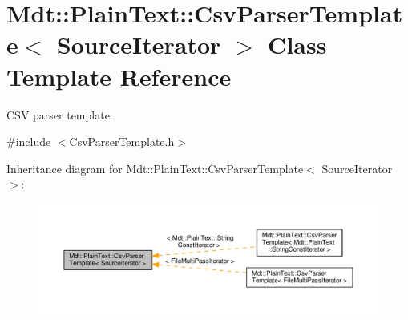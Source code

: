 \hypertarget{class_mdt_1_1_plain_text_1_1_csv_parser_template}{}\section{Mdt\+:\+:Plain\+Text\+:\+:Csv\+Parser\+Template$<$ Source\+Iterator $>$ Class Template Reference}
\label{class_mdt_1_1_plain_text_1_1_csv_parser_template}


C\+SV parser template.  




{\ttfamily \#include $<$Csv\+Parser\+Template.\+h$>$}



Inheritance diagram for Mdt\+:\+:Plain\+Text\+:\+:Csv\+Parser\+Template$<$ Source\+Iterator $>$\+:\nopagebreak
\begin{figure}[H]
\begin{center}
\leavevmode
\includegraphics[width=350pt]{class_mdt_1_1_plain_text_1_1_csv_parser_template__inherit__graph}
\end{center}
\end{figure}

